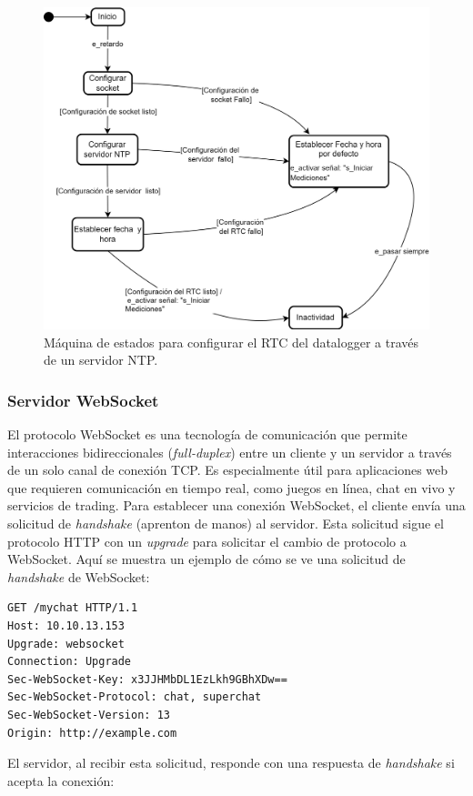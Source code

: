 \begin{figure}[H]
    \centering
    \includegraphics[width=0.8\linewidth]{Figuras/datalogger/Firmware/sc_configRTC.png}
    \caption{Máquina de estados para configurar el RTC del datalogger a través de un servidor NTP.}
    \label{fig:ntpServer}
\end{figure}

\subsubsection{Servidor WebSocket}\label{sec:serverWebSocket}
 
El protocolo WebSocket es una tecnología de comunicación que permite interacciones bidireccionales (\textit{full-duplex}) entre un cliente y un servidor a través de un solo canal de conexión TCP. Es especialmente útil para aplicaciones web que requieren comunicación en tiempo real, como juegos en línea, chat en vivo y servicios de trading. Para establecer una conexión WebSocket, el cliente envía una solicitud de  \textit{handshake} (aprenton de manos) al servidor. Esta solicitud sigue el protocolo HTTP con un \textit{upgrade} para solicitar el cambio de protocolo a WebSocket. Aquí se muestra un ejemplo de cómo se ve una solicitud de \textit{handshake} de WebSocket:

\begin{verbatim}
GET /mychat HTTP/1.1
Host: 10.10.13.153
Upgrade: websocket
Connection: Upgrade
Sec-WebSocket-Key: x3JJHMbDL1EzLkh9GBhXDw==
Sec-WebSocket-Protocol: chat, superchat
Sec-WebSocket-Version: 13
Origin: http://example.com
\end{verbatim}

El servidor, al recibir esta solicitud, responde con una respuesta de \textit{handshake} si acepta la conexión:


